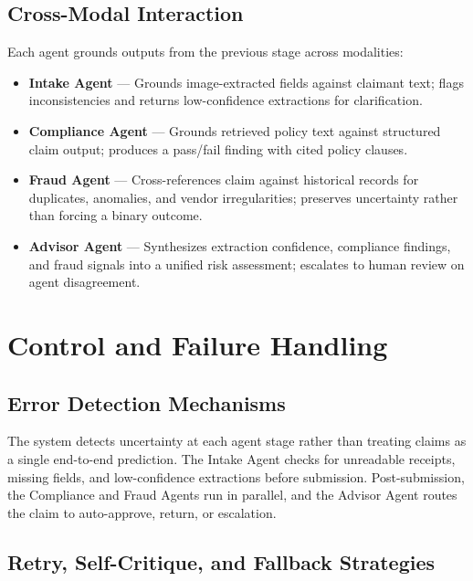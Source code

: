 \documentclass{article}
\begin{document}
\subsection{Cross-Modal Interaction}
\label{sec:cross-modal}

Each agent grounds outputs from the previous stage across modalities:

\begin{itemize}[leftmargin=*,itemsep=0pt]
  \item \textbf{Intake Agent} --- Grounds image-extracted fields against claimant text; flags inconsistencies and returns low-confidence extractions for clarification.
  \item \textbf{Compliance Agent} --- Grounds retrieved policy text against structured claim output; produces a pass/fail finding with cited policy clauses.
  \item \textbf{Fraud Agent} --- Cross-references claim against historical records for duplicates, anomalies, and vendor irregularities; preserves uncertainty rather than forcing a binary outcome.
  \item \textbf{Advisor Agent} --- Synthesizes extraction confidence, compliance findings, and fraud signals into a unified risk assessment; escalates to human review on agent disagreement.
\end{itemize}

\section{Control and Failure Handling}
\label{sec:control}

\subsection{Error Detection Mechanisms}
\label{sec:error-detection}

The system detects uncertainty at each agent stage rather than treating claims as a single end-to-end prediction. The Intake Agent checks for unreadable receipts, missing fields, and low-confidence extractions before submission. Post-submission, the Compliance and Fraud Agents run in parallel, and the Advisor Agent routes the claim to auto-approve, return, or escalation.

\subsection{Retry, Self-Critique, and Fallback Strategies}
\label{sec:fallback}
\end{document}
